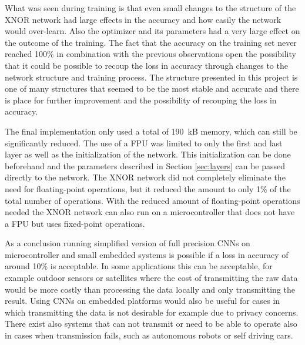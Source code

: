 \documentclass[conference]{IEEEtran}
\begin{document}
What was seen during training is that even small changes to the structure of the XNOR network had large effects in the accuracy and how easily the network would over-learn. Also the optimizer and its parameters had a very large effect on the outcome of the training. The fact that the accuracy on the training set never reached 100\% in combination with the previous observations open the possibility that it could be possible to recoup the loss in accuracy through changes to the network structure and training process. The structure presented in this project is one of many structures that seemed to be the most stable and accurate and there is place for further improvement and the possibility of recouping the loss in accuracy.

The final implementation only used a total of \SI{190}{kB} memory, which can still be significantly reduced. The use of a FPU was limited to only the first and last layer as well as the initialization of the network. This initialization can be done beforehand and the parameters described in Section \ref{sec:layers} can be passed directly to the network. The XNOR network did not completely eliminate the need for floating-point operations, but it reduced the amount to only 1\% of the total number of operations. With the reduced amount of floating-point operations needed the XNOR network can also run on a microcontroller that does not have a FPU but uses fixed-point operations.

As a conclusion running simplified version of full precision CNNs on microcontroller and small embedded systems is possible if a loss in accuracy of around 10\% is acceptable. In some applications this can be acceptable, for example outdoor sensors or satellites where the cost of transmitting the raw data would be more costly than processing the data locally and only transmitting the result. Using CNNs on embedded platforms would also be useful for cases in which transmitting the data is not desirable for example due to privacy concerns. There exist also systems that can not transmit or need to be able to operate also in cases when transmission fails, such as autonomous robots or self driving cars.

%
%
\end{document}
